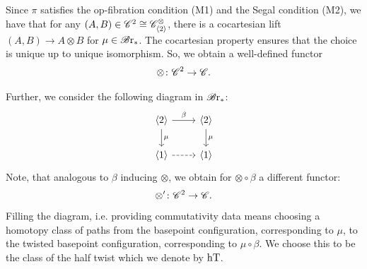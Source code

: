 \begin{const}
\begin{center}
\end{center}

Since $\pi$ satisfies the op-fibration condition (M1) and the Segal condition
(M2), we have that for any $(A,B) \in \mathscr{C}^2 \cong \mathscr{C}^{\otimes}_{\langle 2 \rangle}$,
there is a cocartesian lift $(A,B) \to A \otimes B$ for $\mu \in \mathscr{B} \text{r}_{\ast}$. The
cocartesian property ensures that the choice is unique up to unique isomorphism.
So, we obtain a well-defined functor
\[
    \otimes \colon \mathscr{C}^2 \to \mathscr{C}.
\]

Further, we consider the following diagram in $\mathscr{B} \text{r}_{\ast}$:
\[    
    \begin{tikzcd}
        \langle 2 \rangle \arrow[r, "\beta"] \arrow[d, "\mu"] & \langle 2 \rangle \arrow[d, "\mu"] \\
        \langle 1 \rangle  \arrow[r, dashed]                  & \langle 1 \rangle                
    \end{tikzcd}
\]
Note, that analogous to $\beta$ inducing $\otimes$, we obtain for $\otimes \circ
\beta$ a different functor:
\[
    \otimes' \colon \mathscr{C}^2 \to \mathscr{C}.
\]
Filling the diagram, i.e. providing commutativity data means choosing a homotopy
class of paths from the basepoint configuration, corresponding to $\mu$, to the
twisted basepoint configuration, corresponding to $\mu \circ \beta$. We choose
this to be the class of the half twist which we denote by $\operatorname{hT}$.

\begin{center}
\end{center}
\end{const}
